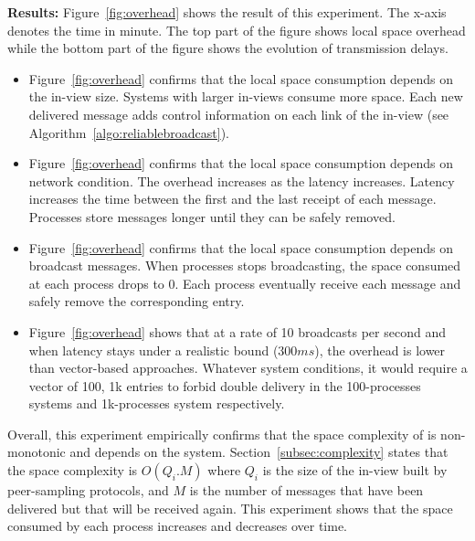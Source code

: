 \noindent \textbf{Results:} Figure~\ref{fig:overhead} shows the result of this
experiment. The x-axis denotes the time in minute. The top part of the figure
shows local space overhead while the bottom part of the figure shows the
evolution of transmission delays. 

\begin{itemize}
\item Figure~\ref{fig:overhead} confirms that the local space consumption
  depends on the in-view size. Systems with larger in-views consume more
  space. Each new delivered message adds control information on each link of the
  in-view (see Algorithm~\ref{algo:reliablebroadcast}).
\item Figure~\ref{fig:overhead} confirms that the local space consumption
  depends on network condition. The overhead increases as the latency
  increases. Latency increases the time between the first and the last receipt
  of each message. Processes store messages longer until they can be safely
  removed. 
\item Figure~\ref{fig:overhead} confirms that the local space consumption
  depends on broadcast messages. When processes stops broadcasting, the space
  consumed at each process drops to 0. Each process eventually receive each
  message and safely remove the corresponding entry.
\item Figure~\ref{fig:overhead} shows that at a rate of 10 broadcasts per second
  and when latency stays under a realistic bound ($300ms$), the overhead is
  lower than vector-based approaches. Whatever system conditions, it would
  require a vector of 100, 1k entries to forbid double delivery in the
  100-processes systems and 1k-processes system respectively. 
\end{itemize}

\noindent Overall, this experiment empirically confirms that the space
complexity of \RPCBROADCAST is non-monotonic and depends on the
system. Section~\ref{subsec:complexity} states that the space complexity is
$O(Q_i.M)$ where $Q_i$ is the size of the in-view built by peer-sampling
protocols, and $M$ is the number of messages that have been delivered but that
will be received again. This experiment shows that the space consumed by each
process increases and decreases over time. \\


